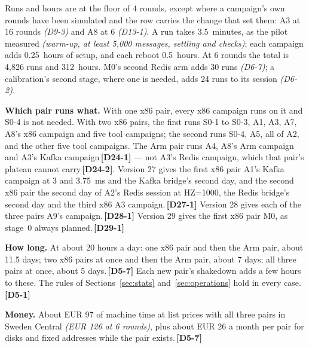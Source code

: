 \documentclass[11pt]{article}
\newcommand{\gl}[1]{{\color{soft}\itshape\small (#1)}}
\newcommand{\chgold}[1]{\,{\color{oldcol}\bfseries\footnotesize[#1]}}
\begin{document}
Runs and hours are at the floor of 4 rounds, except where a campaign's own rounds have been
simulated and the row carries the change that set them: A3 at 16 rounds \gl{D9-3} and A8 at 6
\gl{D13-1}. A run takes 3.5~minutes, as the pilot measured \gl{warm-up, at least 5,000 messages, settling and checks}; each campaign adds 0.25~hours of setup, and each reboot 0.5~hours. At 6 rounds the total is 4,826 runs and 312~hours. M0's second Redis arm adds 30 runs \gl{D6-7}; a calibration's second stage, where one is needed, adds 24 runs to its session \gl{D6-2}.

\textbf{Which pair runs what.} With one x86 pair, every x86 campaign runs on it and S0-4 is not needed. With two x86 pairs, the first runs S0-1 to S0-3, A1, A3, A7, A8's x86 campaign and five tool campaigns; the second runs S0-4, A5, all of A2, and the other five tool campaigns. The Arm pair runs A4, A8's Arm campaign and A3's Kafka campaign\chgold{D24-1} --- not A3's Redis campaign, which that pair's plateau cannot carry\chgold{D24-2}. Version 27 gives the first x86 pair A1's Kafka campaign at 3 and 3.75~ms and the Kafka bridge's second day, and the second x86 pair the second day of A2's Redis session at HZ=1000, the Redis bridge's second day and the third x86 A3 campaign.\chgold{D27-1} Version 28 gives each of the three pairs A9's campaign.\chgold{D28-1} Version 29 gives the first x86 pair M0, as stage~0 always planned.\chgold{D29-1}

\textbf{How long.} At about 20 hours a day: one x86 pair and then the Arm pair, about 11.5 days; two x86 pairs at once and then the Arm pair, about 7 days; all three pairs at once, about 5 days.\chgold{D5-7} Each new pair's shakedown adds a few hours to these. The rules of Sections~\ref{sec:stats} and~\ref{sec:operations} hold in every case.\chgold{D5-1}

\textbf{Money.} About EUR 97 of machine time at list prices with all three pairs in Sweden Central \gl{EUR 126 at 6 rounds}, plus about EUR 26 a month per pair for disks and fixed addresses while the pair exists.\chgold{D5-7}
\end{document}
